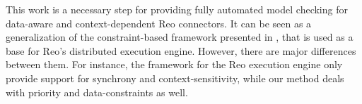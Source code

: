 This work is a necessary step for providing fully automated model checking for data-aware and context-dependent Reo connectors. It can be seen as a generalization of the constraint-based framework presented in \cite{JoseThesis}, that is used as a base for Reo's distributed execution engine. However, there are major differences between them. For instance, the framework for the Reo execution engine only provide support for synchrony and context-sensitivity, while our method deals with priority and data-constraints as well.

%
%
%
